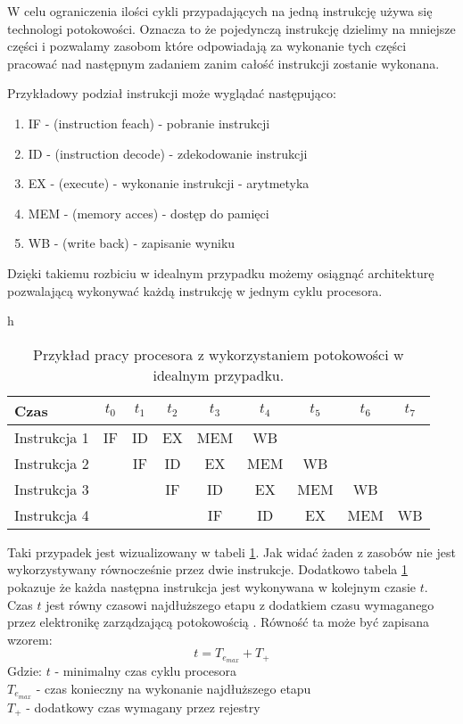 W celu ograniczenia ilości cykli przypadających na jedną instrukcję używa się technologi potokowości. 
Oznacza to że pojedynczą instrukcję dzielimy na mniejsze części i pozwalamy zasobom które odpowiadają za wykonanie tych części pracować nad następnym zadaniem zanim całość instrukcji zostanie wykonana.

Przykładowy podział instrukcji może wyglądać następująco:
\begin{enumerate}
        \item IF - (instruction feach) - pobranie instrukcji
        \item ID - (instruction decode) -  zdekodowanie instrukcji
        \item EX - (execute) - wykonanie instrukcji - arytmetyka
        \item MEM - (memory acces) - dostęp do pamięci
        \item WB - (write back) - zapisanie wyniku
\end{enumerate}

Dzięki takiemu rozbiciu w idealnym przypadku możemy osiągnąć architekturę pozwalającą wykonywać każdą instrukcję w jednym cyklu procesora. 

\begin{table}{h}
        \centering
        \caption{Przykład pracy procesora z wykorzystaniem potokowości w idealnym przypadku.}
        \label{pipelining}
        \begin{tabular}{lcccccccc}
                Czas & $t_0$&$t_1$&$t_2$&$t_3$&$t_4$&$t_5$&$t_6$&$t_7$ \\ \hline
                Instrukcja 1 & IF & ID & EX & MEM & WB &    & \\
                Instrukcja 2 &    & IF & ID & EX & MEM & WB & \\
                Instrukcja 3 &    &    & IF & ID & EX & MEM & WB \\
                Instrukcja 4 &    &    &    & IF & ID & EX & MEM & WB
        \end{tabular}
\end{table}


Taki przypadek jest wizualizowany w tabeli \ref{pipelining}. Jak widać żaden z zasobów nie jest wykorzystywany równocześnie przez dwie instrukcje.
Dodatkowo tabela \ref{pipelining} pokazuje że każda następna instrukcja jest wykonywana w kolejnym czasie $t$. 
Czas $t$ jest równy czasowi najdłuższego etapu z dodatkiem czasu wymaganego przez elektronikę zarządzającą potokowością \cite{arch}.
Równość ta może być zapisana wzorem:
\begin{equation}
        t = T_{e_{max}} + T_{+}
\end{equation}
Gdzie:
        $t$ - minimalny czas cyklu procesora \\
        $T_{e_{max}}$ - czas konieczny na wykonanie najdłuższego etapu \\
        $T_{+}$ - dodatkowy czas wymagany przez rejestry \\



